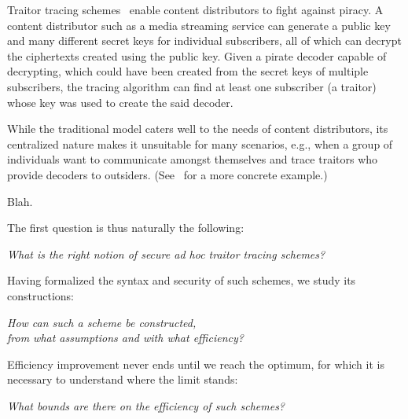 Traitor tracing schemes~\cite{C:ChoFiaNao94} enable content distributors to fight against piracy.
A content distributor such as a media streaming service can generate a public key and many different secret keys for individual subscribers,
all of which can decrypt the ciphertexts created using the public key.
Given a pirate decoder capable of decrypting,
which could have been created from the secret keys of multiple subscribers,
the tracing algorithm can find at least one subscriber (a traitor) whose key was used to create the said decoder.

While the traditional model caters well to the needs of content distributors,
its centralized nature makes it unsuitable for many scenarios,
e.g., when a group of individuals want to communicate amongst themselves and trace traitors who provide decoders to outsiders. (See~\cite{C:Zhandry21} for a more concrete example.)

Blah.

The first question is thus naturally the following:
\begin{center}
\itshape
What is the right notion of secure ad hoc traitor tracing schemes?\\
\end{center}
Having formalized the syntax and security of such schemes,
we study its constructions:
\begin{center}
\itshape
How can such a scheme be constructed,\\
from what assumptions and with what efficiency?
\end{center}
Efficiency improvement never ends until we reach the optimum,
for which it is necessary to understand where the limit stands:
\begin{center}
\itshape
What bounds are there on the efficiency of such schemes?
\end{center}
